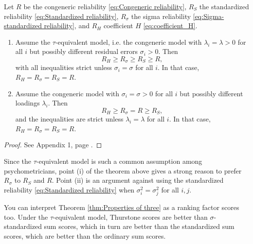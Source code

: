 \documentclass[twoside]{article}
\begin{document}
\begin{thm}
\label{thm:Properties of three} Let $ R$ be the congeneric
reliability \eqref{eq:Congeneric reliability}, $ R_{S}$ the standardized reliability \eqref{eq:Standardized reliability},
$ R_{\sigma}$ the sigma reliability \eqref{eq:Sigma-standardized reliability},
and $ R_{H}$ coefficient $H$ \eqref{eq:coefficient_H}. 

\begin{enumerate}[label=(\roman*)]
\item Assume the $\tau$-equivalent model,
i.e. the congeneric model with $\lambda_{i}=\lambda>0$ for all $i$
but possibly different residual errors $\sigma_{i}>0$. Then
\[
 R_{H}\geq R_{\sigma}\geq R_{S}\geq R,
\]
with all inequalities strict unless $\sigma_{i}=\sigma$ for all
$i$. In that case, $ R_{H} =  R_{\sigma} =  R_{S} =  R$.
\item Assume the congeneric model with $\sigma_i = \sigma > 0$ for all $i$ but possibly different loadings $\lambda_i$. Then
\[
 R_{H}\geq R_{\sigma}= R\geq R_{S},
\]
and the inequalities are strict unless $\lambda_{i}=\lambda$ for all
$i$. In that case, $ R_{H} =  R_{\sigma} =  R_{S} =  R$.

\end{enumerate}

\end{thm}
\begin{proof}
See Appendix 1, page \pageref{proof:Properties}.
\end{proof}

Since the $\tau$-equivalent model is such a common assumption among psychometricians, point (i) of the theorem above gives a strong reason to prefer $ R_{\sigma}$ to $ R_S$ and $ R$. Point (ii) is an argument against using the standardized reliability \eqref{eq:Standardized reliability} when $\sigma_{i}^{2}=\sigma_j^{2}$ for all $i,j$.

You can interpret Theorem \ref{thm:Properties of three} as a ranking factor scores too. Under the $\tau$-equivalent model, Thurstone scores are better than $\sigma$-standardized sum scores, which in turn are better than the standardized sum scores, which are
better than the ordinary sum scores.
\end{document}

